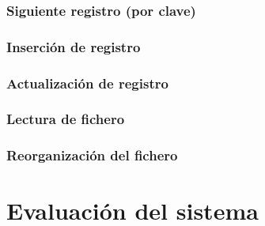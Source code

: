 \subsubsection{Siguiente registro (por clave)}
\subsubsection{Inserción de registro}
\subsubsection{Actualización de registro}
\subsubsection{Lectura de fichero}
\subsubsection{Reorganización del fichero}


\section{Evaluación del sistema}
